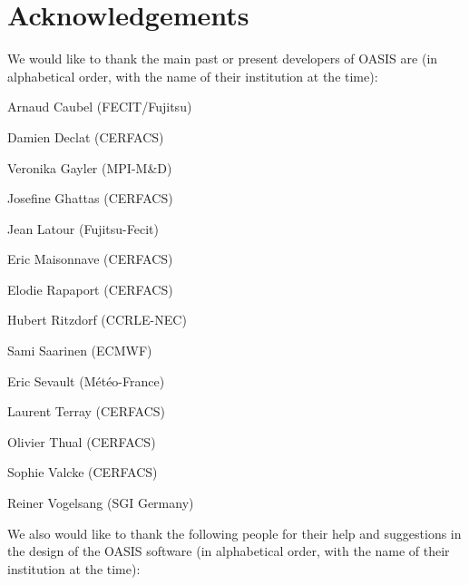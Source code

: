 \newpage


\chapter{Acknowledgements}

We would like to thank the main past or present developers of OASIS
are (in alphabetical order, with the name of their institution at the time):
\begin{description}
  \item Arnaud Caubel (FECIT/Fujitsu)
  \item Damien Declat (CERFACS)
  \item Veronika Gayler (MPI-M\&D)
  \item Josefine Ghattas (CERFACS)
  \item Jean Latour (Fujitsu-Fecit)
  \item Eric Maisonnave (CERFACS)
  \item Elodie Rapaport (CERFACS)
  \item Hubert Ritzdorf (CCRLE-NEC)
  \item Sami Saarinen (ECMWF)
  \item Eric Sevault (M\'et\'eo-France)
  \item Laurent Terray (CERFACS)
  \item Olivier Thual (CERFACS)
  \item Sophie Valcke (CERFACS)
  \item Reiner Vogelsang (SGI Germany)
\end{description}

We also would like to thank the following people for their help
and suggestions in the design of the OASIS software (in alphabetical
order, with the name of their institution at the time):

